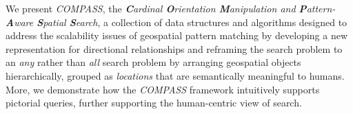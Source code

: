 %

\par{
    We present \emph{COMPASS}, the \textit{\textbf{C}ardinal \textbf{O}rientation \textbf{M}anipulation and \textbf{P}attern-\textbf{A}ware \textbf{S}patial \textbf{S}earch}, a collection of data structures and algorithms designed to address the scalability issues of geospatial pattern matching by developing a new representation for directional relationships and reframing the search problem to an \textit{any} rather than \textit{all} search problem by arranging geospatial objects hierarchically, grouped as \textit{locations} that are semantically meaningful to humans.
    More, we demonstrate how the \emph{COMPASS} framework intuitively supports pictorial queries, further supporting the human-centric view of search.
    }
    
